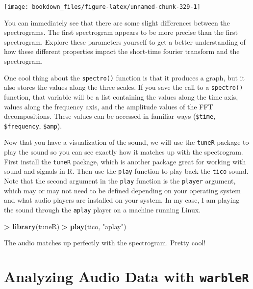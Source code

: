 \documentclass[]{krantz}
\makeatletter
\newenvironment{Shaded}{\begin{snugshade}}{\end{snugshade}}
\newcommand{\KeywordTok}[1]{\textcolor[rgb]{0.27,0.27,0.27}{\textbf{#1}}}
\newcommand{\StringTok}[1]{\textcolor[rgb]{0.5,0.5,0.5}{#1}}
\newcommand{\OperatorTok}[1]{\textcolor[rgb]{0.43,0.43,0.43}{\textbf{#1}}}
\newcommand{\NormalTok}[1]{#1}
\newenvironment{kframe}{%
\medskip{}
\setlength{\fboxsep}{.8em}
 \def\at@end@of@kframe{}%
 \ifinner\ifhmode%
  \def\at@end@of@kframe{\end{minipage}}%
  \begin{minipage}{\columnwidth}%
 \fi\fi%
 \def\FrameCommand##1{\hskip\@totalleftmargin \hskip-\fboxsep
 \colorbox{shadecolor}{##1}\hskip-\fboxsep
     \hskip-\linewidth \hskip-\@totalleftmargin \hskip\columnwidth}%
 \MakeFramed {\advance\hsize-\width
   \@totalleftmargin\z@ \linewidth\hsize
   \@setminipage}}%
 {\par\unskip\endMakeFramed%
 \at@end@of@kframe}
\renewenvironment{Shaded}{\begin{kframe}}{\end{kframe}}
\makeatother
\begin{document}
\texttt{[image: bookdown\_files/figure-latex/unnamed-chunk-329-1]}

You can immediately see that there are some slight differences between
the spectrograms. The first spectrogram appears to be more precise than
the first spectrogram. Explore these parameters yourself to get a better
understanding of how these different properties impact the short-time
fourier transform and the spectrogram.

One cool thing about the \texttt{spectro()} function is that it produces
a graph, but it also stores the values along the three scales. If you
save the call to a \texttt{spectro()} function, that variable will be a
list containing the values along the time axis, values along the
frequency axis, and the amplitude values of the FFT decompositions.
These values can be accessed in familiar ways (\texttt{\$time},
\texttt{\$frequency}, \texttt{\$amp}).

Now that you have a visualization of the sound, we will use the
\texttt{tuneR} package to play the sound so you can see exactly how it
matches up with the spectrogram. First install the \texttt{tuneR}
package, which is another package great for working with sound and
signals in R. Then use the \texttt{play} function to play back the
\texttt{tico} sound. Note that the second argument in the \texttt{play}
function is the \texttt{player} argument, which may or may not need to
be defined depending on your operating system and what audio players are
installed on your system. In my case, I am playing the sound through the
\texttt{aplay} player on a machine running Linux.

\begin{Shaded}
\begin{Highlighting}[]
\OperatorTok{>}\StringTok{ }\KeywordTok{library}\NormalTok{(tuneR)}
\OperatorTok{>}\StringTok{ }\KeywordTok{play}\NormalTok{(tico, }\StringTok{"aplay"}\NormalTok{)}
\end{Highlighting}
\end{Shaded}

The audio matches up perfectly with the spectrogram. Pretty cool!

\section{\texorpdfstring{Analyzing Audio Data with
\texttt{warbleR}}{Analyzing Audio Data with warbleR}}\label{analyzing-audio-data-with-warbler}
\end{document}
